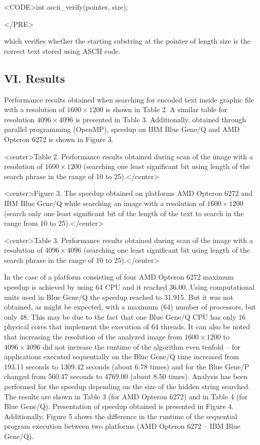 \documentclass[10pt, a5paper]{article}
\begin{document}
<CODE>int ascii\_verify(pointer, size);

</PRE>

which verifies whether the starting substring at the pointer of length size is the correct text stored using ASCII code.

\subsection*{VI. Results}

Performance results obtained when searching for encoded text inside graphic file with a resolution of $1600\times1200$ is shown in Table 2. A similar table for resolution $4096\times4096$ is presented in Table 3. Additionally, obtained through parallel programming (OpenMP), speedup on IBM Blue Gene/Q and AMD Opteron 6272 is shown in Figure 3.


<center>Table 2. Performance results obtained during scan of the image with a resolution of $1600\times1200$ (searching one least significant bit using length of the search phrase in the range of 10 to 25).</center>


<center>Figure 3. The speedup obtained on platforms AMD Opteron 6272 and IBM Blue Gene/Q while searching an image with a resolution of $1600\times1200$ (search only one least significant bit of the length of the text to search in the range from 10 to 25).</center>


<center>Table 3. Performance results obtained during scan of the image with a resolution of $4096\times4096$ (searching one least significant bit using length of the search phrase in the range of 10 to 25).</center>

In the case of a platform consisting of four AMD Opteron 6272 maximum speedup is achieved by using 64 CPU and it reached 36.00. Using computational units used in Blue Gene/Q the speedup reached to 31.915. But it was not obtained, as might be expected, with a maximum (64) number of processors, but only 48. This may be due to the fact that one Blue Gene/Q CPU has only 16 physical cores that implement the execution of 64 threads.
It can also be noted that increasing the resolution of the analyzed image from $1600\times1200$ to $4096\times4096$ did not increase the runtime of the algorithm even tenfold -- for applications executed sequentially on the Blue Gene/Q time increased from 193.11 seconds to 1309.42 seconds (about 6.78 times) and for the Blue Gene/P changed from 560.47 seconds to 4769.00 (about 8.50 times). Analysis has been performed for the speedup depending on the size of the hidden string searched. The results are shown in Table 3 (for AMD Opteron 6272) and in Table 4 (for Blue Gene/Q). Presentation of speedup obtained is presented in Figure 4. Additionally, Figure 5 shows the difference in the runtime of the sequential program execution between two platforms (AMD Opteron 6272 -- IBM Blue Gene/Q).
\end{document}
